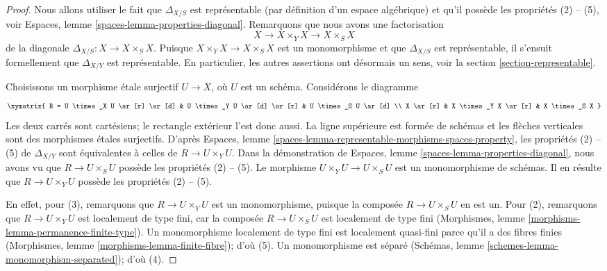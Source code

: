 \begin{proof}
Nous allons utiliser le fait que $\Delta_{X/S}$ est
représentable (par définition d'un espace algébrique) et qu'il
possède les propriétés (2) -- (5), voir
Espaces, lemme \ref{spaces-lemma-properties-diagonal}.
Remarquons que nous avons une factorisation
$$
X
\longrightarrow
X \times_Y X
\longrightarrow
X \times_S X
$$
de la diagonale $\Delta_{X/S} : X \to X \times_S X$. Puisque
$X \times_Y X \to X \times_S X$ est un monomorphisme et que
$\Delta_{X/S}$ est représentable, il s'ensuit formellement que
$\Delta_{X/Y}$ est représentable. En particulier, les autres
assertions ont désormais un sens, voir
la section \ref{section-representable}.

\medskip\noindent
Choisissons un morphisme \'etale surjectif $U \to X$, où $U$ est un schéma.
Considérons le diagramme
$$
\xymatrix{
R = U \times_X U \ar[r] \ar[d] &
U \times_Y U \ar[d] \ar[r] &
U \times_S U \ar[d] \\
X \ar[r] & X \times_Y X \ar[r] & X \times_S X
}
$$
Les deux carrés sont cartésiens; le rectangle extérieur l'est donc aussi.
La ligne supérieure est formée de schémas et les flèches verticales
sont des morphismes \'etales surjectifs. D'après
Espaces, lemme \ref{spaces-lemma-representable-morphisms-spaces-property},
les propriétés (2) -- (5) de $\Delta_{X/Y}$ sont équivalentes à celles de
$R \to U \times_Y U$. Dans la démonstration de
Espaces, lemme \ref{spaces-lemma-properties-diagonal},
nous avons vu que $R \to U \times_S U$ possède les propriétés (2) -- (5).
Le morphisme $U \times_Y U \to U \times_S U$ est un monomorphisme
de schémas. Il en résulte que $R \to U \times_Y U$ possède les
propriétés (2) -- (5).

\medskip\noindent
En effet, pour (3), remarquons que $R \to U \times_Y U$
est un monomorphisme, puisque la composée
$R \to U \times_S U$ en est un. Pour (2), remarquons que
$R \to U \times_Y U$ est localement de type fini, car la
composée $R \to U \times_S U$ est localement de type fini
(Morphismes, lemme \ref{morphisms-lemma-permanence-finite-type}).
Un monomorphisme localement de type fini est localement quasi-fini
parce qu'il a des fibres finies
(Morphismes, lemme \ref{morphisms-lemma-finite-fibre}); d'où (5).
Un monomorphisme est séparé
(Schémas, lemme \ref{schemes-lemma-monomorphism-separated}); d'où (4).
\end{proof}

